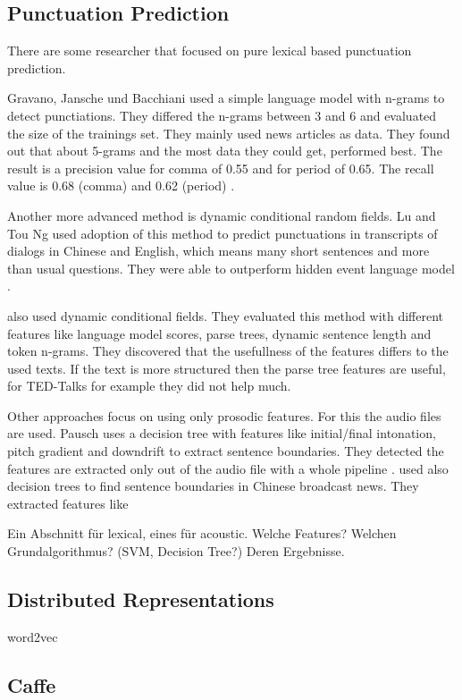 
\subsection{Punctuation Prediction}
There are some researcher that focused on pure lexical based punctuation prediction.

Gravano, Jansche und Bacchiani used a simple language model with n-grams to detect punctiations. 
They differed the n-grams between 3 and 6 and evaluated the size of the trainings set. 
They mainly used news articles as data. They found out that about 5-grams and the most data they could get, performed best.
The result is a precision value for comma of 0.55 and for period of 0.65. 
The recall value is 0.68 (comma) and 0.62 (period) \cite{gravano09}. 

Another more advanced method is dynamic conditional random fields. 
Lu and Tou Ng used adoption of this method to predict punctuations in transcripts of dialogs in Chinese and English, which means many short sentences and more than usual questions. 
They were able to outperform hidden event language model \cite{Lu_betterpunctuation}.

\cite{DBLP:conf/interspeech/UeffingBV13} also used dynamic conditional fields. They evaluated this method with different features like language model scores, parse trees, dynamic sentence length and token n-grams. 
They discovered that the usefullness of the features differs to the used texts. If the text is more structured then the parse tree features are useful, for TED-Talks for example they did not help much.

Other approaches focus on using only prosodic features. For this the audio files are used.
Pausch uses a decision tree with features like initial/final intonation, pitch gradient and downdrift to extract sentence boundaries. They detected the features are extracted only out of the audio file with a whole pipeline \cite{Pausch2011}.
\cite{conf/iscslp/XieXW12} used also decision trees to find sentence boundaries in Chinese broadcast news. They extracted features like


Ein Abschnitt für lexical, eines für acoustic.
Welche Features?
Welchen Grundalgorithmus? (SVM, Decision Tree?)
Deren Ergebnisse.



\subsection{Distributed Representations}
word2vec
\subsection{Caffe}
